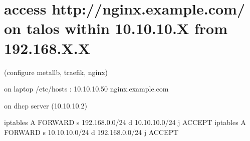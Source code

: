 \documentclass[letterpaper,10pt,english]{sphinxmanual}
\begin{document}
\section{access http://nginx.example.com/ on talos within 10.10.10.X from 192.168.X.X}
\label{\detokenize{cluster:access-http-nginx-example-com-on-talos-within-10-10-10-x-from-192-168-x-x}}
\sphinxAtStartPar
(configure metallb, traefik, nginx)

\sphinxAtStartPar
on laptop /etc/hosts : 10.10.10.50 nginx.example.com

\sphinxAtStartPar
on dhcp server (10.10.10.2)

\sphinxAtStartPar
iptables \sphinxhyphen{}A FORWARD \sphinxhyphen{}s 192.168.0.0/24 \sphinxhyphen{}d 10.10.10.0/24 \sphinxhyphen{}j ACCEPT
iptables \sphinxhyphen{}A FORWARD \sphinxhyphen{}s 10.10.10.0/24 \sphinxhyphen{}d 192.168.0.0/24 \sphinxhyphen{}j ACCEPT
\end{document}
